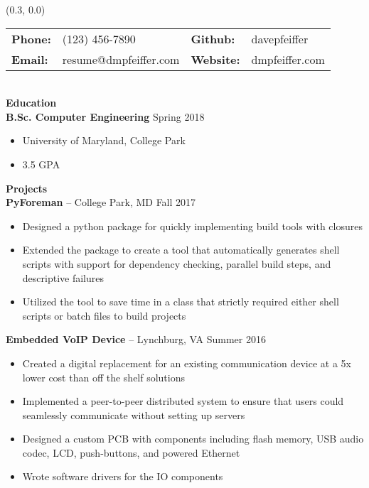 \documentclass[10pt]{article}
\begin{document}
  \begin{textblock}{0.7}(0.3, 0.0)

    \begin{tabular}{ l l l l }
      \bfseries Phone: & (123) 456-7890 & 
      \bfseries Github: & davepfeiffer \\
      \bfseries Email: & resume@dmpfeiffer.com & 
      \bfseries Website: & dmpfeiffer.com \\
    \end{tabular} \\

    \textbf{\large Education } \\
      \textbf{B.Sc. Computer Engineering} \hfill Spring 2018
      \begin{itemize}
        \setlength{\itemsep}{0pt}
        \item University of Maryland, College Park
        \item 3.5 GPA
      \end{itemize}
    \textbf{\large Projects} \\
      \textbf{PyForeman} -- College Park, MD \hfill Fall 2017
      \begin{itemize}
        \item Designed a python package for quickly implementing build tools with closures
        \item Extended the package to create a tool that automatically generates shell scripts with support for dependency checking, parallel build steps, and descriptive failures
        \item Utilized the tool to save time in a class that strictly required either shell scripts or batch files to build projects
      \end{itemize}
      \textbf{Embedded VoIP Device} -- Lynchburg, VA \hfill Summer 2016
      \begin{itemize}
        \setlength{\itemsep}{0pt}
        \item Created a digital replacement for an existing communication device at a 5x lower cost than off the shelf solutions
        \item Implemented a peer-to-peer distributed system to ensure that users could seamlessly communicate without setting up servers
        \item Designed a custom PCB with components including flash memory, USB audio codec, LCD, push-buttons, and powered Ethernet
        \item Wrote software drivers for the IO components

\end{itemize}
\end{textblock}
\end{document}
